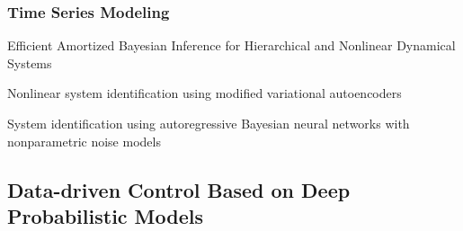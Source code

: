 \subsubsection{Time Series Modeling} 





Efficient Amortized Bayesian Inference for Hierarchical and Nonlinear Dynamical Systems

Nonlinear system identification using modified variational autoencoders

System identification using autoregressive Bayesian neural networks with nonparametric noise models





\subsection{Data-driven Control Based on Deep Probabilistic Models}